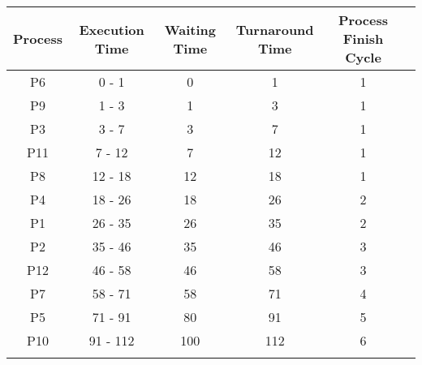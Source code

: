 \documentclass{article}
\begin{document}
\begin{center}
    \begin{tabular}{|c|c|c|c|c|c|}
    \hline
    \rowcolor{darkblue}
    {\textbf{Process}} &{\textbf{Execution Time}} & {\textbf{Waiting Time}} & {\textbf{Turnaround Time}} & {\textbf{Process Finish Cycle}} \\
    \hline \rowcolor{lightblue}
    P6 & 0 - 1 & 0 & 1 & 1 \\
    \hline 
    P9 & 1 - 3 & 1 & 3 & 1 \\
    \hline \rowcolor{lightblue}
    P3 & 3 - 7 & 3 & 7 & 1 \\
    \hline
    P11 & 7 - 12 & 7 & 12 & 1 \\
    \hline \rowcolor{lightblue}
    P8 & 12 - 18 & 12 & 18 & 1 \\
    \hline
    P4 & 18 - 26 & 18 & 26 & 2 \\
    \hline \rowcolor{lightblue}
    P1 & 26 - 35 & 26 & 35 & 2 \\
    \hline
    P2 & 35 - 46 & 35 & 46 & 3 \\
    \hline \rowcolor{lightblue}
    P12 & 46 - 58 & 46 & 58 & 3 \\
    \hline
    P7 & 58 - 71 & 58 & 71 & 4 \\
    \hline \rowcolor{lightblue}
    P5 & 71 - 91 & 80 & 91 & 5 \\
    \hline
    P10 & 91 - 112 & 100 & 112 & 6 \\
    \hline \rowcolor{lightblue}
    \end{tabular}
\end{center}
\end{document}
